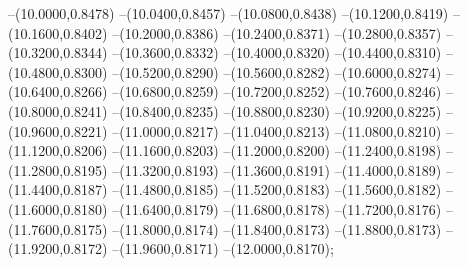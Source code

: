 {	--(10.0000,0.8478)
	--(10.0400,0.8457)
	--(10.0800,0.8438)
	--(10.1200,0.8419)
	--(10.1600,0.8402)
	--(10.2000,0.8386)
	--(10.2400,0.8371)
	--(10.2800,0.8357)
	--(10.3200,0.8344)
	--(10.3600,0.8332)
	--(10.4000,0.8320)
	--(10.4400,0.8310)
	--(10.4800,0.8300)
	--(10.5200,0.8290)
	--(10.5600,0.8282)
	--(10.6000,0.8274)
	--(10.6400,0.8266)
	--(10.6800,0.8259)
	--(10.7200,0.8252)
	--(10.7600,0.8246)
	--(10.8000,0.8241)
	--(10.8400,0.8235)
	--(10.8800,0.8230)
	--(10.9200,0.8225)
	--(10.9600,0.8221)
	--(11.0000,0.8217)
	--(11.0400,0.8213)
	--(11.0800,0.8210)
	--(11.1200,0.8206)
	--(11.1600,0.8203)
	--(11.2000,0.8200)
	--(11.2400,0.8198)
	--(11.2800,0.8195)
	--(11.3200,0.8193)
	--(11.3600,0.8191)
	--(11.4000,0.8189)
	--(11.4400,0.8187)
	--(11.4800,0.8185)
	--(11.5200,0.8183)
	--(11.5600,0.8182)
	--(11.6000,0.8180)
	--(11.6400,0.8179)
	--(11.6800,0.8178)
	--(11.7200,0.8176)
	--(11.7600,0.8175)
	--(11.8000,0.8174)
	--(11.8400,0.8173)
	--(11.8800,0.8173)
	--(11.9200,0.8172)
	--(11.9600,0.8171)
	--(12.0000,0.8170);
}
